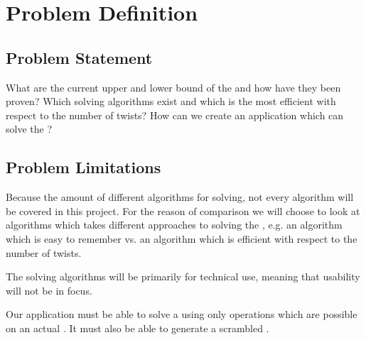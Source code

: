 \chapter{Problem Definition}
\section{Problem Statement}
What are the current upper and lower bound of the \rubik{} and how have they been proven? \newline\newline
Which solving algorithms exist and which is the most efficient with respect to the number of twists? \newline\newline
How can we create an application which can solve the \rubik{}?

\section{Problem Limitations}
Because the amount of different algorithms for \rubik{} solving, not every algorithm will be covered in this project.
For the reason of comparison we will choose to look at algorithms which takes different approaches to solving the \rubik{}, e.g. an algorithm which is easy to remember vs. an algorithm which is efficient with respect to the number of twists.

The \rubik{} solving algorithms will be primarily for technical use, meaning that usability will not be in focus.

Our application must be able to solve a \rubik{} using only operations which are possible on an actual \rubik{}.
It must also be able to generate a scrambled \rubik{}.

